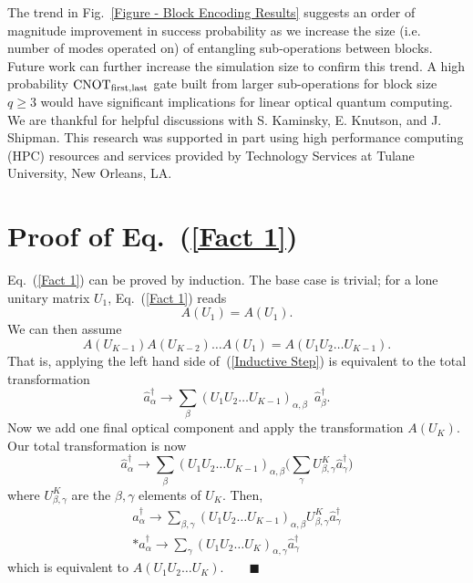 \documentclass[aps,pra,twocolumn,showpacs,superscriptaddress,floatfix,10pt]{revtex4}
\begin{document}
 The trend in Fig.~\ref{Figure - Block Encoding Results} suggests an order of magnitude improvement in success probability as we increase the size (i.e. number of modes operated on) of entangling sub-operations between blocks. Future work can further increase the simulation size to confirm this trend. A high probability $\mbox{CNOT}_{\rm first,last}$ gate built from larger sub-operations for block size $q \ge 3$ would have significant implications for linear optical quantum computing.
\acknowledgments
We are thankful for helpful discussions with S. Kaminsky, E. Knutson, and J. Shipman. This research was supported in part using high performance computing (HPC) resources and services provided by Technology Services at Tulane University, New Orleans, LA.
\appendix
\section{Proof of Eq.~(\ref{Fact 1})}
\label{Proof of Fact 1}
Eq.~(\ref{Fact 1}) can be proved by induction. The base case is trivial; for a lone unitary matrix $U_1$, Eq.~(\ref{Fact 1}) reads
\begin{equation}
	A(U_1) = A(U_1).
\end{equation}
We can then assume
\begin{equation}
\label{Inductive Step}
	A(U_{K-1}) A(U_{K-2}) \dots A(U_1) = A(U_1 U_2 \dots U_{K-1}).
\end{equation}
That is, applying the left hand side of~(\ref{Inductive Step}) is equivalent to the total transformation
\begin{equation}
	\hat{a}^\dagger_\alpha \rightarrow \sum_\beta (U_1 U_2 \dots U_{K-1})_{\alpha,\beta} \enspace \hat{a}^\dagger_\beta.
\end{equation}
Now we add one final optical component and apply the transformation $A(U_K)$. Our total transformation is now
\begin{equation}
	\hat{a}^\dagger_\alpha \rightarrow \sum_\beta (U_1 U_2 \dots U_{K-1})_{\alpha,\beta} \Big(\sum_\gamma U_{\beta,\gamma}^K \hat{a}^\dagger_\gamma \Big)
\end{equation}
where $U_{\beta,\gamma}^K$ are the $\beta,\gamma$ elements of $U_K$. Then,
\begin{eqnarray}
\hat{a}^\dagger_\alpha \rightarrow \sum_{\beta,\gamma} (U_1 U_2 \dots U_{K-1})_{\alpha,\beta} U^K_{\beta,\gamma} \hat{a}^\dagger_\gamma
\\*
\hat{a}^\dagger_\alpha \rightarrow \sum_\gamma (U_1 U_2 \dots U_K)_{\alpha,\gamma} \hat{a}^\dagger_\gamma \quad
\end{eqnarray}
which is equivalent to $A(U_1 U_2 \dots U_K). \quad \quad\blacksquare $
\end{document}
